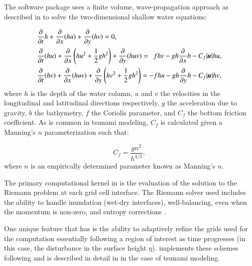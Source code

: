 \subsection{\geoclaw} \label{ssub:geoclaw}
The \geoclaw software package uses a finite volume, wave-propagation approach as described in \cite{LeVeque:1997eg} to solve the two-dimensional shallow water equations:

\begin{equation} \label{eq:swe}
    \begin{aligned}
    &\pd{}{t} h + \pd{}{x} (hu) + \pd{}{y} (hv) = 0, \\
    &\pd{}{t}(hu) + \pd{}{x} \left(hu^2 + \frac{1}{2} g h^2 \right ) + \pd{}{y} (huv) = ~~ fhv - gh \pd{}{x} b - C_f |\vec{u}| hu, \\
    &\pd{}{t} (hv) + \pd{}{x} (huv) + \pd{}{y} \left (hv^2 + \frac{1}{2} gh^2 \right) = -fhu - gh \pd{}{y} b - C_f |\vec{u}| hv,
    \end{aligned}
\end{equation} 
where $h$ is the depth of the water column, $u$ and $v$ the velocities in the 
longitudinal and latitudinal directions respectively, $g$ the acceleration due 
to gravity, $b$ the bathymetry, $f$ the Coriolis parameter, and $C_f$ the bottom 
friction coefficient.  As is common in tsunami modeling, $C_f$ is calculated 
given a Manning's $n$ parameterization such that:

\begin{equation}
    C_f = \frac{g n^2}{h^{4/3}},
\label{eq:coef}
\end{equation}
where $n$ is an empirically determined parameter known as Manning's $n$.  

The primary computational kernel in \geoclaw is the evaluation of the solution to the Riemann problem at each grid cell interface.  The Riemann solver used includes the ability to handle inundation (wet-dry interfaces), well-balancing, even when the momentum is non-zero, \alert{and entropy corrections} \cite{George:2008aa}.

One unique feature that \geoclaw has is the ability to adaptively refine the grids used for the computation essentially following a region of interest as time progresses (in this case, the disturbance in the surface height $\eta$).  \geoclaw implements these schemes following \cite{Berger:1984ui,Berger:1998aa} and is described in detail in \cite{Berger:2011du} in the case of tsunami modeling.

